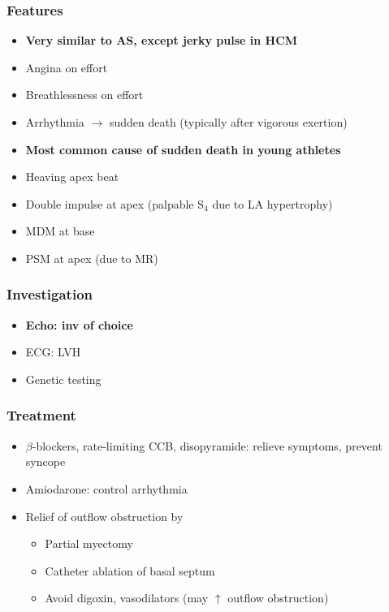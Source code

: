 \documentclass[
  12pt,
]{memoir}
\providecommand{\tightlist}{%
  \setlength{\itemsep}{0pt}\setlength{\parskip}{0pt}}
\begin{document}
\hypertarget{features-15}{%
\subsubsection{Features}\label{features-15}}

\begin{itemize}
\tightlist
\item
  \textbf{Very similar to AS, except jerky pulse in HCM}
\item
  Angina on effort
\item
  Breathlessness on effort
\item
  Arrhythmia \(\rightarrow\) sudden death (typically after vigorous
  exertion)
\item
  \textbf{Most common cause of sudden death in young athletes}
\item
  Heaving apex beat
\item
  Double impulse at apex (palpable S\(_4\) due to LA hypertrophy)
\item
  MDM at base
\item
  PSM at apex (due to MR)
\end{itemize}

\hypertarget{investigation-18}{%
\subsubsection{Investigation}\label{investigation-18}}

\begin{itemize}
\tightlist
\item
  \textbf{Echo: inv of choice}
\item
  ECG: LVH
\item
  Genetic testing
\end{itemize}

\hypertarget{treatment-8}{%
\subsubsection{Treatment}\label{treatment-8}}

\begin{itemize}
\tightlist
\item
  \(\beta\)-blockers, rate-limiting CCB, disopyramide: relieve symptoms,
  prevent syncope
\item
  Amiodarone: control arrhythmia
\item
  Relief of outflow obstruction by

  \begin{itemize}
  \tightlist
  \item
    Partial myectomy
  \item
    Catheter ablation of basal septum
  \item
    Avoid digoxin, vasodilators (may \(\uparrow\) outflow obstruction)
  \end{itemize}
\end{itemize}
\end{document}
